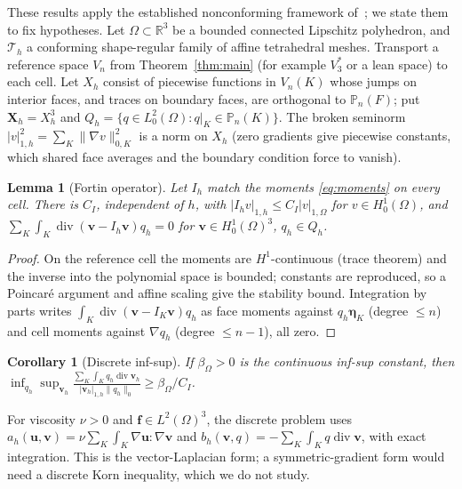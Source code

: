 \documentclass[11pt,a4paper]{article}
\newtheorem{lemma}[theorem]{Lemma}
\newtheorem{corollary}[theorem]{Corollary}
\theoremstyle{definition}
\theoremstyle{remark}
\newcommand{\Pol}{\mathbb P}
\begin{document}
These results apply the established nonconforming framework
of~\cite{CR1973,BAJO2025}; we state them to fix hypotheses. Let
\(\Omega\subset\mathbb R^3\) be a bounded connected Lipschitz polyhedron, and
\(\mathcal T_h\) a conforming shape-regular family of affine tetrahedral
meshes. Transport a reference space \(V_n\) from Theorem~\ref{thm:main} (for
example \(V_3^*\) or a lean space) to each cell. Let \(X_h\) consist of
piecewise functions in \(V_n(K)\) whose jumps on interior faces, and traces on
boundary faces, are orthogonal to \(\Pol_n(F)\); put \(\mathbf X_h=X_h^3\) and
\(Q_h=\{q\in L^2_0(\Omega):q|_K\in\Pol_n(K)\}\). The broken seminorm
\(|v|_{1,h}^2=\sum_K\|\nabla v\|_{0,K}^2\) is a norm on \(X_h\) (zero gradients give
piecewise constants, which shared face averages and the boundary condition
force to vanish).

\begin{lemma}[Fortin operator]
\label{lem:fortin}
Let \(I_h\) match the moments \eqref{eq:moments} on every cell. There is
\(C_I\), independent of \(h\), with \(|I_hv|_{1,h}\le C_I|v|_{1,\Omega}\) for
\(v\in H^1_0(\Omega)\), and
\(\sum_K\int_K\operatorname{div}(\mathbf v-I_h\mathbf v)q_h=0\) for
\(\mathbf v\in H^1_0(\Omega)^3\), \(q_h\in Q_h\).
\end{lemma}

\begin{proof}
On the reference cell the moments are \(H^1\)-continuous (trace theorem) and
the inverse into the polynomial space is bounded; constants are reproduced, so
a Poincaré argument and affine scaling give the stability bound. Integration
by parts writes \(\int_K\operatorname{div}(\mathbf v-I_K\mathbf v)q_h\) as face
moments against \(q_h\boldsymbol\eta_K\) (degree \(\le n\)) and cell moments
against \(\nabla q_h\) (degree \(\le n-1\)), all zero.
\end{proof}

\begin{corollary}[Discrete inf-sup]
If \(\beta_\Omega>0\) is the continuous inf-sup constant, then
\(\inf_{q_h}\sup_{\mathbf v_h}\frac{\sum_K\int_Kq_h\operatorname{div}\mathbf v_h}
{|\mathbf v_h|_{1,h}\|q_h\|_0}\ge\beta_\Omega/C_I\).
\end{corollary}

For viscosity \(\nu>0\) and \(\mathbf f\in L^2(\Omega)^3\), the discrete problem
uses \(a_h(\mathbf u,\mathbf v)=\nu\sum_K\int_K\nabla\mathbf u:\nabla\mathbf v\) and
\(b_h(\mathbf v,q)=-\sum_K\int_Kq\operatorname{div}\mathbf v\), with exact
integration. This is the vector-Laplacian form; a symmetric-gradient form
would need a discrete Korn inequality, which we do not study.
\end{document}
